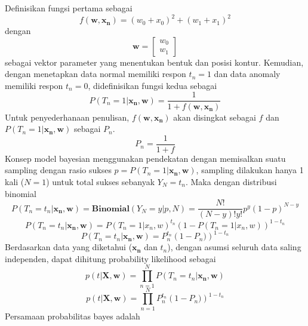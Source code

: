 Definisikan fungsi pertama sebagai
\begin{equation}
    f(\mathbf{w,x_n})=(w_0+x_0)^2+(w_1+x_1)^2 \label{fungsi_f}
\end{equation}
dengan
\begin{equation}
    \mathbf{w}=\begin{bmatrix} w_0 \\ w_1 \end{bmatrix}
\end{equation}
sebagai vektor parameter yang menentukan bentuk dan posisi kontur. Kemudian, dengan menetapkan data normal memiliki respon $t_n=1$ dan data anomaly memiliki respon $t_n=0$, didefinisikan fungsi kedua sebagai
\begin{equation*}
    P(T_n=1|\mathbf{x_n}, \mathbf{w}) = \frac{1}{1+f(\mathbf{w,x_n})}
\end{equation*}
Untuk penyederhanaan penulisan, $f(\mathbf{w,x_n})$ akan disingkat sebagai $f$ dan $P(T_n=1|\mathbf{x_n}, \mathbf{w})$ sebagai $P_n$.
\begin{equation}
    P_n = \frac{1}{1+f}
\end{equation}
Konsep model bayesian menggunakan pendekatan dengan memisalkan suatu sampling dengan rasio sukses $p = P(T_n=1|\mathbf{x_n},\mathbf{w})$, sampling dilakukan hanya 1 kali ($N=1$) untuk total sukses sebanyak $Y_N=t_n$. Maka dengan distribusi binomial
\begin{equation*}
    P(T_n=t_n|\mathbf{x_n},\mathbf{w})=\mathbf{Binomial}(Y_N=y|p,N)=\frac{N!}{(N-y)!y!}p^{y}(1-p)^{N-y}
\end{equation*}
\begin{equation*}
    P(T_n=t_n|\mathbf{x_n},\mathbf{w})=P(T_n=1|x_n,w)^{t_n}\left(1-P(T_n=1|x_n,w)\right)^{1-t_n}
\end{equation*}
\begin{equation}
    P(T_n=t_n|\mathbf{x_n},\mathbf{w})=P_n^{t_n}\left(1-P_n)\right)^{1-t_n} \label{likelihood}
\end{equation}
Berdasarkan data yang diketahui ($\mathbf{x_n}$ dan $t_n$), dengan asumsi seluruh data saling independen, dapat dihitung probability likelihood sebagai
\begin{equation*}
    p(t|\mathbf{X},\mathbf{w})=\prod_{n=1}^{N} P(T_n=t_n|\mathbf{x_n},\mathbf{w})
\end{equation*}
\begin{equation}
    p(t|\mathbf{X},\mathbf{w})=\prod_{n=1}^{N} P_n^{t_n}\left(1-P_n)\right)^{1-t_n}
\end{equation}
Persamaan probabilitas bayes adalah
